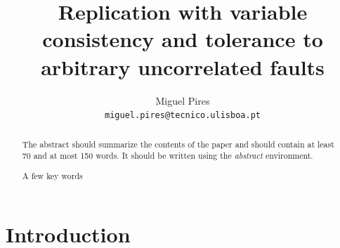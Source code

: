 \documentclass[runningheads,a4paper]{llncs}
\newcommand{\keywords}[1]{\par\addvspace\baselineskip
\noindent\keywordname\enspace\ignorespaces#1}
\begin{document}
\mainmatter  %

\title{Replication with variable consistency and tolerance to arbitrary uncorrelated faults}

\author{Miguel Pires \\
\texttt{miguel.pires@tecnico.ulisboa.pt}}



%
%

\let\oldaddcontentsline\addcontentsline
\def\addcontentsline#1#2#3{}
\maketitle
\def\addcontentsline#1#2#3{\oldaddcontentsline{#1}{#2}{#3}}


\begin{abstract}
The abstract should summarize the contents of the paper and should
contain at least 70 and at most 150 words. It should be written using the
\emph{abstract} environment.
\keywords{A few key words}
\end{abstract}

\newpage
\tableofcontents
\newpage

\section{Introduction}
\end{document}
